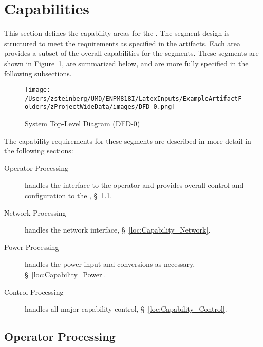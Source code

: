 \KNEADSECTIONNEWPAGE
\section{Capabilities}
\label{lab:sec_Capabilities}
% 


This section defines the capability areas for the \ThisSys.
The segment design is structured to meet the requirements as specified in the \TBD artifacts.
Each area provides a subset of the overall capabilities for the \ThisSys segments.
These segments are shown in Figure~\ref{fig:DFD-0}, are summarized below, and are more fully specified in the following subsections.
\begin{figure}[htbp]
	\centering
		\texttt{[image: /Users/zsteinberg/UMD/ENPM818I/LatexInputs/ExampleArtifactFolders/zProjectWideData/images/DFD-0.png]}
	\caption[System Top-Level Diagram]{System Top-Level Diagram (DFD-0)}
	\label{fig:DFD-0}
\end{figure}
 
The capability requirements for these segments are described in more detail in the following sections:
\begin{description}
	\item[Operator Processing] handles the \HMI interface to the operator and provides overall control and configuration to the \ThisSys, \S~\ref{loc:Capability_Operator}.
	\item[Network Processing] handles the network interface, \S~\ref{loc:Capability_Network}.
	\item[Power Processing] handles the power input and conversions as necessary, \S~\ref{loc:Capability_Power}.
	\item[Control Processing] handles all major capability control, \S~\ref{loc:Capability_Control}.
\end{description}

\newpage
\subsection{Operator Processing}
\label{loc:Capability_Operator}

